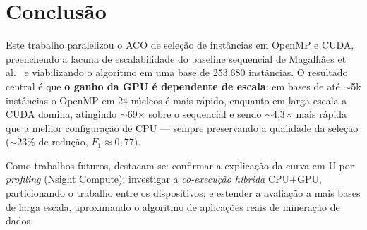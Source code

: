 \documentclass[12pt]{article}
\begin{document}
\section{Conclusão}

Este trabalho paralelizou o ACO de seleção de instâncias em OpenMP e CUDA, preenchendo a lacuna
de escalabilidade do baseline sequencial de Magalhães et al.~\cite{magalhaes2024} e viabilizando
o algoritmo em uma base de 253.680 instâncias. O resultado central é que \textbf{o ganho da GPU é
dependente de escala}: em bases de até $\sim$5k instâncias o OpenMP em 24 núcleos é mais rápido,
enquanto em larga escala a CUDA domina, atingindo $\sim$69$\times$ sobre o sequencial e sendo
$\sim$4,3$\times$ mais rápida que a melhor configuração de CPU --- sempre preservando a qualidade
da seleção ($\sim$23\% de redução, $F_1\approx0{,}77$).

Como trabalhos futuros, destacam-se: confirmar a explicação da curva em U por \textit{profiling}
(Nsight Compute); investigar a \textit{co-execução híbrida} CPU+GPU, particionando o trabalho
entre os dispositivos; e estender a avaliação a mais bases de larga escala, aproximando o
algoritmo de aplicações reais de mineração de dados.




\end{document}
